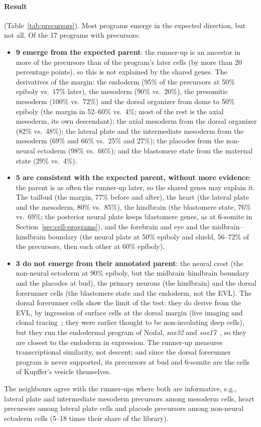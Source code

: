 \documentclass[11pt,a4paper]{article}
\begin{document}
\paragraph{Result} (Table~\ref{tab:precursors}). Most programs emerge in the expected direction, but not all. Of the 17 programs with precursors:
\begin{itemize}
	\item \textbf{9 emerge from the expected parent}: the runner-up is an ancestor in more of the precursors than of the program's later cells (by more than 20 percentage points), so this is not explained by the shared genes. The derivatives of the margin: the endoderm (95\% of the precursors at 50\% epiboly vs.\ 17\% later), the mesoderm (90\% vs.\ 20\%), the presomitic mesoderm (100\% vs.\ 72\%) and the dorsal organizer from dome to 50\% epiboly (the margin in 52--60\% vs.\ 4\%; most of the rest is the axial mesoderm, its own descendant); the axial mesoderm from the dorsal organizer (82\% vs.\ 48\%); the lateral plate and the intermediate mesoderm from the mesoderm (69\% and 66\% vs.\ 25\% and 27\%); the placodes from the non-neural ectoderm (98\% vs.\ 66\%); and the blastomere state from the maternal state (29\% vs.\ 4\%).
	\item \textbf{5 are consistent with the expected parent, without more evidence}: the parent is as often the runner-up later, so the shared genes may explain it. The tailbud (the margin, 77\% before and after), the heart (the lateral plate and the mesoderm, 80\% vs.\ 85\%), the hindbrain (the blastomere state, 76\% vs.\ 69\%; the posterior neural plate keeps blastomere genes, as at 6-somite in Section~\ref{sec:cell-programs}), and the forebrain and eye and the midbrain--hindbrain boundary (the neural plate at 50\% epiboly and shield, 56--72\% of the precursors, then each other at 60\% epiboly).
	\item \textbf{3 do not emerge from their annotated parent}: the neural crest (the non-neural ectoderm at 90\% epiboly, but the midbrain--hindbrain boundary and the placodes at bud), the primary neurons (the hindbrain) and the dorsal forerunner cells (the blastomere state and the endoderm, not the EVL). The dorsal forerunner cells show the limit of the test: they do derive from the EVL, by ingression of surface cells at the dorsal margin (live imaging and clonal tracing~\cite{oteiza2008,warga2018}; they were earlier thought to be non-involuting deep cells), but they run the endodermal program of Nodal, \emph{sox32} and \emph{sox17}~\cite{kikuchi2001}, so they are closest to the endoderm in expression. The runner-up measures transcriptional similarity, not descent; and since the dorsal forerunner program is never supported, its precursors at bud and 6-somite are the cells of Kupffer's vesicle themselves.
\end{itemize}
The neighbours agree with the runner-ups where both are informative, e.g., lateral plate and intermediate mesoderm precursors among mesoderm cells, heart precursors among lateral plate cells and placode precursors among non-neural ectoderm cells (5--18 times their share of the library).
\end{document}
